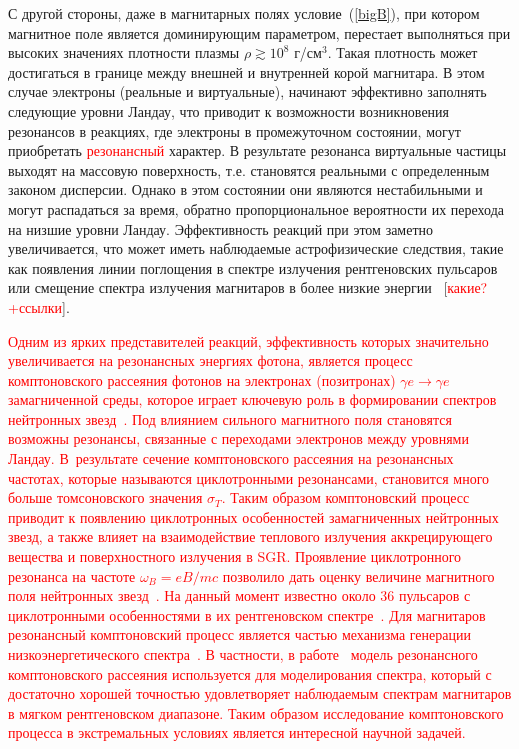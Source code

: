 С другой стороны, даже в магнитарных полях условие~(\ref{bigB}), при котором магнитное поле является доминирующим параметром, перестает выполняться при высоких значениях плотности плазмы $\rho \gtrsim 10^8$ г/см$^3$. Такая плотность может достигаться в  границе между внешней и внутренней корой магнитара. В этом случае электроны (реальные и виртуальные), начинают эффективно заполнять следующие уровни Ландау, что приводит к возможности возникновения резонансов в реакциях, где электроны в промежуточном состоянии, могут приобретать \textcolor{red}{резонансный} характер.
 В результате резонанса виртуальные частицы выходят на массовую поверхность, т.е. становятся реальными с определенным законом дисперсии. 
Однако в этом состоянии они являются нестабильными и могут распадаться за время, обратно пропорциональное вероятности их перехода на низшие уровни Ландау. Эффективность реакций при этом заметно увеличивается, что 
может иметь наблюдаемые астрофизические следствия, такие как появления линии поглощения в спектре излучения рентгеновских пульсаров~\cite{Truemper1978} или смещение спектра излучения магнитаров в более низкие энергии~\cite{Lyutikov:2002}  [\textcolor{red}{какие?+ссылки}].

\textcolor{red}{Одним из ярких представителей реакций, эффективность которых значительно увеличивается на резонансных энергиях фотона, является процесс комптоновского  рассеяния фотонов на электронах (позитронах) $\gamma e \to \gamma e$ 
замагниченной среды, которое играет ключевую роль в формировании спектров нейтронных звезд~\cite{Miller:1995,Bulik:1997,Suleimanov:2007it,Nobili:2008,Taverna:2014}.
Под влиянием сильного магнитного поля становятся возможны резонансы, связанные с переходами электронов между уровнями Ландау. В~результате сечение комптоновского рассеяния на резонансных частотах, которые называются циклотронными резонансами, становится много больше томсоновского значения $\sigma_T$. Таким образом комптоновский процесс приводит к появлению циклотронных особенностей замагниченных нейтронных звезд, а также влияет на взаимодействие теплового излучения аккрецирующего вещества и поверхностного излучения в SGR. Проявление циклотронного резонанса на частоте $\omega_B=eB/mc$ позволило дать оценку величине магнитного поля нейтронных звезд~\cite{Mitrofanov:1982}.  На данный момент известно около 36 пульсаров с циклотронными особенностями в их рентгеновском спектре~\cite{Staubert:2019}. Для магнитаров резонансный комптоновский процесс является частью механизма генерации низкоэнергетического спектра~\cite{Lyutikov:2002,Rea:2008}. В частности, в работе~\cite{Rea:2008} модель резонансного комптоновского рассеяния используется для моделирования спектра, который с достаточно хорошей точностью удовлетворяет наблюдаемым спектрам магнитаров в мягком рентгеновском диапазоне. Таким образом исследование комптоновского процесса в экстремальных условиях является интересной научной задачей.}

